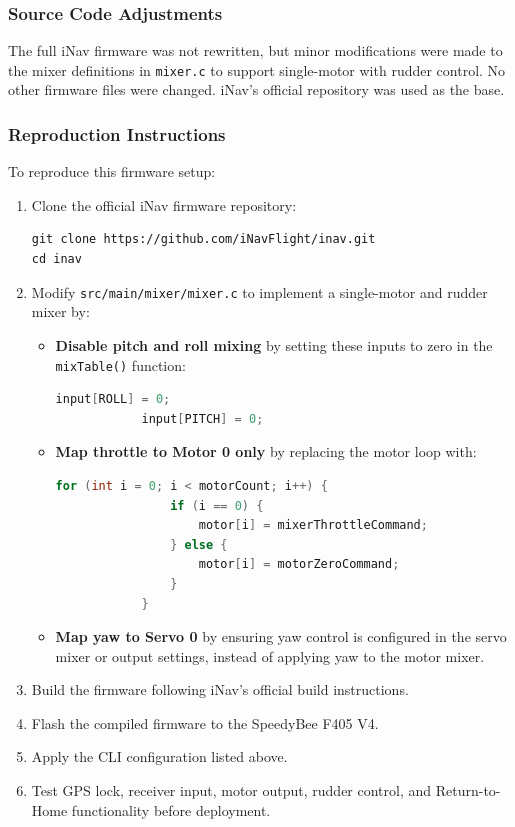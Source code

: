 \subsubsection*{Source Code Adjustments}

The full iNav firmware was not rewritten, but minor modifications were made to the mixer definitions in \texttt{mixer.c} to support single-motor with rudder control. No other firmware files were changed. iNav’s official repository was used as the base.

\subsubsection*{Reproduction Instructions}

To reproduce this firmware setup:

\begin{enumerate}
    \item Clone the official iNav firmware repository:
    \begin{lstlisting}
git clone https://github.com/iNavFlight/inav.git
cd inav
    \end{lstlisting}

    
    \item Modify \texttt{src/main/mixer/mixer.c} to implement a single-motor and rudder mixer by:
    \begin{itemize}
        \item \textbf{Disable pitch and roll mixing} by setting these inputs to zero in the \texttt{mixTable()} function:
        \begin{lstlisting}[language=C]
            input[ROLL] = 0;
            input[PITCH] = 0;
        \end{lstlisting}

        \item \textbf{Map throttle to Motor 0 only} by replacing the motor loop with:
        \begin{lstlisting}[language=C]
            for (int i = 0; i < motorCount; i++) {
                if (i == 0) {
                    motor[i] = mixerThrottleCommand;
                } else {
                    motor[i] = motorZeroCommand;
                }
            }
        \end{lstlisting}

        \item \textbf{Map yaw to Servo 0} by ensuring yaw control is configured in the servo mixer or output settings, instead of applying yaw to the motor mixer.
    \end{itemize}


    \item Build the firmware following iNav's official build instructions.

    \item Flash the compiled firmware to the SpeedyBee F405 V4.

    \item Apply the CLI configuration listed above.

    \item Test GPS lock, receiver input, motor output, rudder control, and Return-to-Home functionality before deployment.
\end{enumerate}

